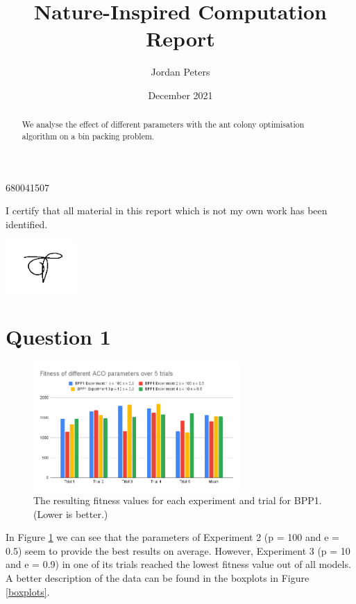 \documentclass[a4paper, 11pt]{article}
\title{Nature-Inspired Computation Report}
\author{Jordan Peters}
\date{December 2021}
\begin{document}
\maketitle

\begin{abstract}

    We analyse the effect of different parameters with the ant colony optimisation algorithm on a bin packing problem.

\end{abstract}

\begin{center}
    680041507

    I certify that all material in this report which is not my own work has been identified.

    \includegraphics[width=100px]{figs/sig.png}
\end{center}

\section{Question 1}

\begin{figure}[h]
    \centering
    \includegraphics[width=0.7\textwidth]{figs/fitness bar charts.png}
    \caption{The resulting fitness values for each experiment and trial for BPP1. (Lower is better.)}
    \label{bpp1-bar-chart}
\end{figure}

In Figure \ref{bpp1-bar-chart} we can see that the parameters of Experiment 2 (p = 100 and e = 0.5) seem to provide the best results on average. However, Experiment 3 (p = 10 and e = 0.9) in one of its trials reached the lowest fitness value out of all models. A better description of the data can be found in the boxplots in Figure \ref{boxplots}.
\end{document}
